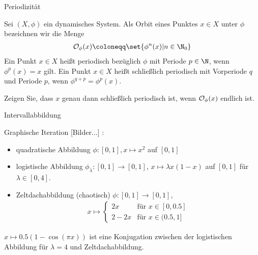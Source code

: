 \begin{definition} Periodizität
  
  Sei $(X, \phi)$ ein dynamisches System. Als Orbit eines Punktes $x \in X$ unter $\phi$ bezeichnen wir die Menge 
  \begin{align*}
    {\cal O}_\phi \text{}(x) \coloneqq \set{\phi^n (x) | n \in \N_0}
  \end{align*}
Ein Punkt $x \in X$ heißt periodisch bezüglich $\phi$ mit Periode $p \in \N$, wenn $\phi^p(x)=x$ gilt. Ein Punkt $x \in X$ heißt schließlich periodisch mit Vorperiode $q$ und Periode $p$, wenn $\phi^{q+p} =\phi^p(x)$.
\end{definition}
\begin{uebung}
  Zeigen Sie, dass $x$ genau dann schließlich periodisch ist, wenn ${\cal O}_\phi(x)$ endlich ist.
\end{uebung}
\begin{beispiel}Intervallabbildung
  
  Graphische Iteration [Bilder...] :
  \begin{itemize}
  \item quadratische Abbildung $\phi:[0,1], x \mapsto x^2$ auf $[0,1]$
  \item logistische Abbildung $\phi_\lambda:[0,1] \to [0,1]$, $x \mapsto \lambda x(1-x)$ auf $[0,1]$ für $\lambda \in [0,4]$.
  \item Zeltdachabbildung (chaotisch) $\phi:[0,1] \to [0,1],$
    \begin{align*}
      x \mapsto
      \begin{cases}
        2x & \text{für } x \in [0, 0.5] \\
        2-2x & \text{für } x \in (0.5, 1] 
      \end{cases}
    \end{align*}
  \end{itemize}
\end{beispiel}

\begin{uebung}
$x \mapsto 0.5(1 - \cos(\pi x))$ ist eine Konjugation zwischen der logistischen Abbildung für $\lambda = 4$ und Zeltdachabbildung.
\end{uebung}

